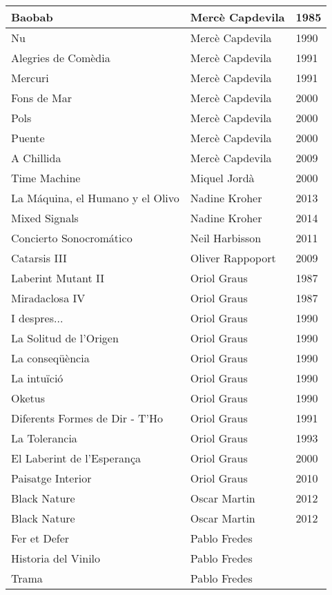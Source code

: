 \begin{center}
\begin{longtable}{ p{}  p{}  p{} }
Baobab & Mercè Capdevila & 1985 \\ \midrule 
Nu & Mercè Capdevila & 1990 \\ \midrule 
Alegries de Comèdia & Mercè Capdevila & 1991 \\ \midrule 
Mercuri & Mercè Capdevila & 1991 \\ \midrule 
Fons de Mar & Mercè Capdevila & 2000 \\ \midrule 
Pols & Mercè Capdevila & 2000 \\ \midrule 
Puente & Mercè Capdevila & 2000 \\ \midrule 
A Chillida & Mercè Capdevila & 2009 \\ \midrule 
Time Machine & Miquel Jordà & 2000 \\ \midrule 
La Máquina, el Humano y el Olivo & Nadine Kroher & 2013 \\ \midrule 
Mixed Signals & Nadine Kroher & 2014 \\ \midrule 
Concierto Sonocromático & Neil Harbisson & 2011 \\ \midrule 
Catarsis III & Oliver Rappoport & 2009 \\ \midrule 
Laberint Mutant II & Oriol Graus & 1987 \\ \midrule 
Miradaclosa IV & Oriol Graus & 1987 \\ \midrule 
I despres... & Oriol Graus & 1990 \\ \midrule 
La Solitud de l'Origen & Oriol Graus & 1990 \\ \midrule 
La conseqüència & Oriol Graus & 1990 \\ \midrule 
La intuïció & Oriol Graus & 1990 \\ \midrule 
Oketus & Oriol Graus & 1990 \\ \midrule 
Diferents Formes de Dir - T'Ho & Oriol Graus & 1991 \\ \midrule 
La Tolerancia & Oriol Graus & 1993 \\ \midrule 
El Laberint de l'Esperança & Oriol Graus & 2000 \\ \midrule 
Paisatge Interior & Oriol Graus & 2010 \\ \midrule 
Black Nature & Oscar Martin & 2012 \\ \midrule 
Black Nature & Oscar Martin & 2012 \\ \midrule 
Fer et Defer & Pablo Fredes &  \\ \midrule 
Historia del Vinilo & Pablo Fredes &  \\ \midrule 
Trama & Pablo Fredes &  \\ \midrule 

\end{longtable}
\end{center}
